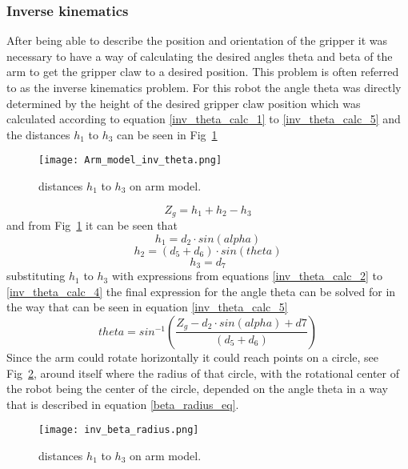 \subsubsection{Inverse kinematics}
After being able to describe the position and orientation of the gripper it was necessary to have a way of calculating the desired angles theta and beta of the arm to get the gripper claw to a desired position. This problem is often referred to as the inverse kinematics problem. For this robot the angle theta was directly determined by the height of the desired gripper claw position which was calculated according to equation \ref{inv_theta_calc_1} to \ref{inv_theta_calc_5} and the distances \(h_1\) to \(h_3\) can be seen in Fig~\ref{inv_theta_img}
\begin{figure}[H]
    \centering
    \texttt{[image: Arm\_model\_inv\_theta.png]}
    \caption{distances \(h_1\) to \(h_3\) on arm model.}
    \label{inv_theta_img}
\end{figure}
\begin{equation}
    Z_g = h_1+h_2 - h_3
    \label{inv_theta_calc_1}
\end{equation}
and from Fig~\ref{inv_theta_img} it can be seen that
\begin{equation}
    h_1 = d_2 \cdot sin(alpha)
    \label{inv_theta_calc_2}
\end{equation}
\begin{equation}
    h_2 = (d_5 + d_6) \cdot sin(theta)
    \label{inv_theta_calc_3}
\end{equation}
\begin{equation}
    h_3 = d_7
    \label{inv_theta_calc_4}
\end{equation}
substituting \(h_1\) to \(h_3\) with expressions from equations  \ref{inv_theta_calc_2} to  \ref{inv_theta_calc_4} the final expression for the angle theta can be solved for in the way that can be seen in equation \ref{inv_theta_calc_5}
\begin{equation}
    theta = sin^{-1}(\frac{Z_g - d_2 \cdot sin(alpha) + d7}{(d_5 + d_6)})
    \label{inv_theta_calc_5}
\end{equation}
Since the arm could rotate horizontally it could reach points on a circle, see Fig~\ref{inv_beta_radius_img}, around itself where the radius of that circle, with the rotational center of the robot being the center of the circle, depended on the angle theta in a way that is described in equation \ref{beta_radius_eq}.
\begin{figure}[H]
    \centering
    \texttt{[image: inv\_beta\_radius.png]}
    \caption{distances \(h_1\) to \(h_3\) on arm model.}
    \label{inv_beta_radius_img}
\end{figure}
